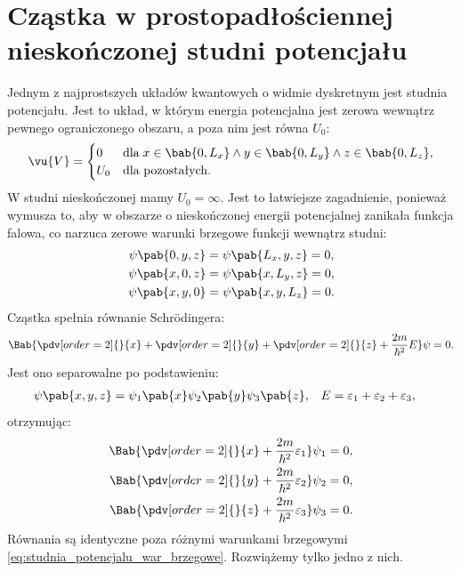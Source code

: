 
\chapter{Cząstka w prostopadłościennej nieskończonej studni potencjału}
Jednym z najprostszych układów kwantowych o widmie dyskretnym jest studnia potencjału. Jest to układ, w którym energia potencjalna jest zerowa wewnątrz pewnego ograniczonego obszaru, a poza nim jest równa \(U_0\):
\begin{equation*}
	\vu{V} = 
	\begin{cases}
		0 &\text{dla}\; x \in \bab{0, L_x} \wedge y \in \bab{0, L_y} \wedge z \in \bab{0, L_z}, \\
		U_0 &\text{dla pozostałych}.
	\end{cases}
\end{equation*}
W studni nieskończonej mamy \(U_0 = \infty\). Jest to łatwiejsze zagadnienie, ponieważ wymusza to, aby w obszarze o nieskończonej energii potencjalnej zanikała funkcja falowa, co narzuca zerowe warunki brzegowe funkcji wewnątrz studni:
\begin{gather}\label{eq:studnia_potencjalu_war_brzegowe}
	\psi\pab{0, y, z} = \psi\pab{L_x, y, z} = 0, \\
	\psi\pab{x, 0, z} = \psi\pab{x, L_y, z} = 0, \\
	\psi\pab{x, y, 0} = \psi\pab{x, y, L_z} = 0.
\end{gather}
Cząstka spełnia równanie Schr\"{o}dingera:
\begin{equation*}
	\Bab{\pdv[order=2]{}{x} + \pdv[order=2]{}{y} + \pdv[order=2]{}{z} + \frac{2m}{\hbar^2}E}\psi=0.
\end{equation*}
Jest ono separowalne po podstawieniu:
\begin{align*}
	\psi\pab{x,y,z} &= \psi_{1}\pab{x} \psi_{2}\pab{y} \psi_{3}\pab{z}, & 
	E &= \varepsilon_{1} + \varepsilon_{2} + \varepsilon_{3},
\end{align*}
otrzymując:
\begin{align*}
	\Bab{\pdv[order=2]{}{x} + \frac{2m}{\hbar^2}\varepsilon_{1}}\psi_{1} &= 0, \\
	\Bab{\pdv[order=2]{}{y} + \frac{2m}{\hbar^2}\varepsilon_{2}}\psi_{2} &= 0, \\
	\Bab{\pdv[order=2]{}{z} + \frac{2m}{\hbar^2}\varepsilon_{3}}\psi_{3} &= 0.
\end{align*}
Równania są identyczne poza różnymi warunkami brzegowymi \eqref{eq:studnia_potencjalu_war_brzegowe}. Rozwiążemy tylko jedno z nich.

